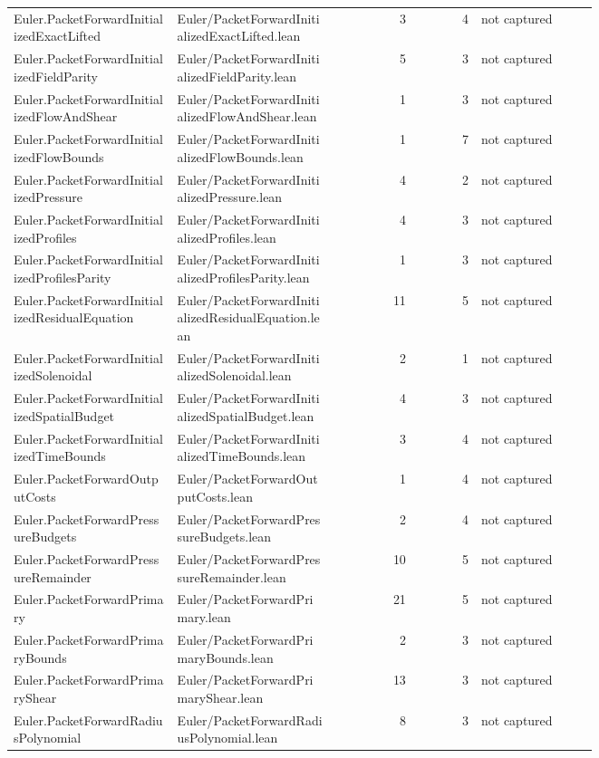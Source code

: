 \documentclass[10pt]{article}
\begin{document}
\begin{longtable}{p{0.28\linewidth}p{0.27\linewidth}r r p{0.20\linewidth}}
Euler.PacketForwardInitializedExactLifted & Euler/PacketForwardInitializedExactLifted.lean & 3 & 4 & not captured\\
Euler.PacketForwardInitializedFieldParity & Euler/PacketForwardInitializedFieldParity.lean & 5 & 3 & not captured\\
Euler.PacketForwardInitializedFlowAndShear & Euler/PacketForwardInitializedFlowAndShear.lean & 1 & 3 & not captured\\
Euler.PacketForwardInitializedFlowBounds & Euler/PacketForwardInitializedFlowBounds.lean & 1 & 7 & not captured\\
Euler.PacketForwardInitializedPressure & Euler/PacketForwardInitializedPressure.lean & 4 & 2 & not captured\\
Euler.PacketForwardInitializedProfiles & Euler/PacketForwardInitializedProfiles.lean & 4 & 3 & not captured\\
Euler.PacketForwardInitializedProfilesParity & Euler/PacketForwardInitializedProfilesParity.lean & 1 & 3 & not captured\\
Euler.PacketForwardInitializedResidualEquation & Euler/PacketForwardInitializedResidualEquation.lean & 11 & 5 & not captured\\
Euler.PacketForwardInitializedSolenoidal & Euler/PacketForwardInitializedSolenoidal.lean & 2 & 1 & not captured\\
Euler.PacketForwardInitializedSpatialBudget & Euler/PacketForwardInitializedSpatialBudget.lean & 4 & 3 & not captured\\
Euler.PacketForwardInitializedTimeBounds & Euler/PacketForwardInitializedTimeBounds.lean & 3 & 4 & not captured\\
Euler.PacketForwardOutputCosts & Euler/PacketForwardOutputCosts.lean & 1 & 4 & not captured\\
Euler.PacketForwardPressureBudgets & Euler/PacketForwardPressureBudgets.lean & 2 & 4 & not captured\\
Euler.PacketForwardPressureRemainder & Euler/PacketForwardPressureRemainder.lean & 10 & 5 & not captured\\
Euler.PacketForwardPrimary & Euler/PacketForwardPrimary.lean & 21 & 5 & not captured\\
Euler.PacketForwardPrimaryBounds & Euler/PacketForwardPrimaryBounds.lean & 2 & 3 & not captured\\
Euler.PacketForwardPrimaryShear & Euler/PacketForwardPrimaryShear.lean & 13 & 3 & not captured\\
Euler.PacketForwardRadiusPolynomial & Euler/PacketForwardRadiusPolynomial.lean & 8 & 3 & not captured\\

\end{longtable}
\end{document}
